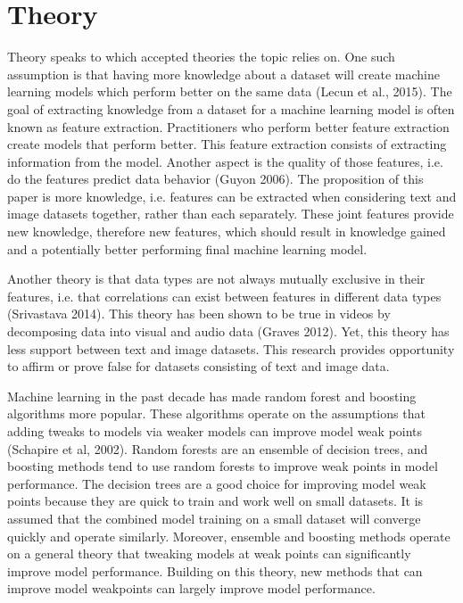 \chapter{Theory} %

Theory speaks to which accepted theories the topic relies on.  One such assumption is that having more knowledge about a dataset will create machine learning models which perform better on the same data (Lecun et al., 2015).  The goal of extracting knowledge from a dataset for a machine learning model is often known as feature extraction.  Practitioners who perform better feature extraction create models that perform better.  This feature extraction consists of extracting information from the model.  Another aspect is the quality of those features, i.e. do the features predict data behavior (Guyon 2006).  The proposition of this paper is more knowledge, i.e. features can be extracted when considering text and image datasets together, rather than each separately.  These joint features provide new knowledge, therefore new features, which should result in knowledge gained and a potentially better performing final machine learning model.  

Another theory is that data types are not always mutually exclusive in their features, i.e. that correlations can exist between features in different data types (Srivastava 2014).  This theory has been shown to be true in videos by decomposing data into visual and audio data (Graves 2012).  Yet, this theory has less support between text and image datasets.  This research provides opportunity to affirm or prove false for datasets consisting of text and image data.  

Machine learning in the past decade has made random forest and boosting algorithms more popular.  These algorithms operate on the assumptions that adding tweaks to models via weaker models can improve model weak points (Schapire et al, 2002).  Random forests are an ensemble of decision trees, and boosting methods tend to use random forests to improve weak points in model performance.  The decision trees are a good choice for improving model weak points because they are quick to train and work well on small datasets.  It is assumed that the combined model training on a small dataset will converge quickly and operate similarly.  Moreover, ensemble and boosting methods operate on a general theory that tweaking models at weak points can significantly improve model performance.  Building on this theory, new methods that can improve model weakpoints can largely improve model performance.  


